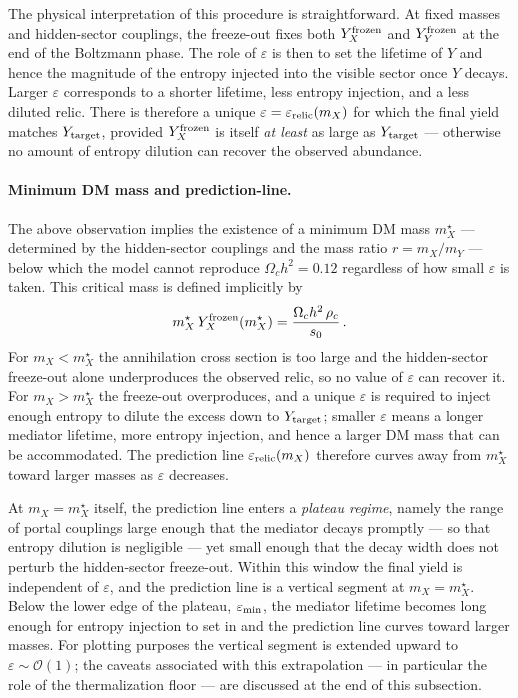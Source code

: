 \documentclass[11pt]{article}
\numberwithin{equation}{section}
\begin{document}
The physical interpretation of this procedure is straightforward. At fixed masses and hidden-sector couplings, the freeze-out fixes both $Y_X^{\rm frozen}$ and $Y_Y^{\rm frozen}$ at the end of the Boltzmann phase. The role of $\varepsilon$ is then to set the lifetime of $Y$ and hence the magnitude of the entropy injected into the visible sector once $Y$ decays. Larger $\varepsilon$ corresponds to a shorter lifetime, less entropy injection, and a less diluted relic. There is therefore a unique $\varepsilon = \varepsilon_{\rm relic}(m_X)$ for which the final yield matches $Y_{\rm target}$, provided $Y_X^{\rm frozen}$ is itself \emph{at least} as large as $Y_{\rm target}$ --- otherwise no amount of entropy dilution can recover the observed abundance.


\paragraph{Minimum DM mass and prediction-line.}

The above observation implies the existence of a minimum DM mass $m_X^\star$ --- determined by the hidden-sector couplings and the mass ratio $r = m_X/m_Y$ --- below which the model cannot reproduce $\Omega_c h^2 = 0.12$ regardless of how small $\varepsilon$ is taken. This critical mass is defined implicitly by
\begin{equation}
    m_X^\star\,Y_X^{\rm frozen}(m_X^\star) = \frac{\Omega_c h^2\,\rho_c}{s_0}\,.
    \label{eq:mXstar_def}
\end{equation}
For $m_X < m_X^\star$ the annihilation cross section is too large and the hidden-sector freeze-out alone underproduces the observed relic, so no value of $\varepsilon$ can recover it. For $m_X > m_X^\star$ the freeze-out overproduces, and a unique $\varepsilon$ is required to inject enough entropy to dilute the excess down to $Y_{\rm target}$; smaller $\varepsilon$ means a longer mediator lifetime, more entropy injection, and hence a larger DM mass that can be accommodated. The prediction line $\varepsilon_{\rm relic}(m_X)$ therefore curves away from $m_X^\star$ toward larger masses as $\varepsilon$ decreases.

At $m_X = m_X^\star$ itself, the prediction line enters a \emph{plateau regime}, namely the range of portal couplings large enough that the mediator decays promptly --- so that entropy dilution is negligible --- yet small enough that the decay width does not perturb the hidden-sector freeze-out. Within this window the final yield is independent of $\varepsilon$, and the prediction line is a vertical segment at $m_X = m_X^\star$. Below the lower edge of the plateau, $\varepsilon_{\rm min}$, the mediator lifetime becomes long enough for entropy injection to set in and the prediction line curves toward larger masses. For plotting purposes the vertical segment is extended upward to $\varepsilon \sim \mathcal{O}(1)$; the caveats associated with this extrapolation --- in particular the role of the thermalization floor --- are discussed at the end of this subsection.
\end{document}
